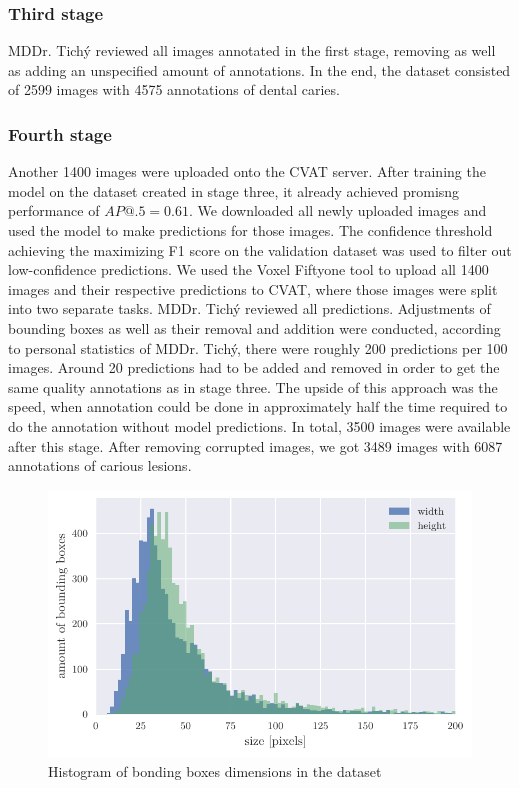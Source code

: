 \subsubsection{Third stage}
MDDr. Tichý reviewed all images annotated in the first stage, removing as well as adding an unspecified amount of annotations. In the end, the dataset consisted of 2599 images with 4575 annotations of dental caries.

\subsubsection{Fourth stage}
Another 1400 images were uploaded onto the CVAT server. After training the model on the dataset created in stage three, it already achieved promisng performance of $AP@.5=0.61$. We downloaded all newly uploaded images and used the model to make predictions for those images. The confidence threshold achieving the maximizing F1 score on the validation dataset was used to filter out low-confidence predictions. We used the Voxel Fiftyone tool to upload all 1400 images and their respective predictions to CVAT, where those images were split into two separate tasks.
MDDr. Tichý reviewed all predictions. Adjustments of bounding boxes as well as their removal and addition were conducted, according to personal statistics of MDDr. Tichý, there were roughly 200 predictions per 100 images. Around 20 predictions had to be added and removed in order to get the same quality annotations as in stage three. The upside of this approach was the speed, when annotation could be done in approximately half the time required to do the annotation without model predictions. In total, 3500 images were available after this stage. After removing corrupted images, we got 3489 images with 6087 annotations of carious lesions.

\begin{figure}
    \includegraphics[width = \linewidth]{images/dataset_histogram.pdf}
    \caption{Histogram of bonding boxes dimensions in the dataset}
    \label{fig:hist_caries_dim}
\end{figure}

